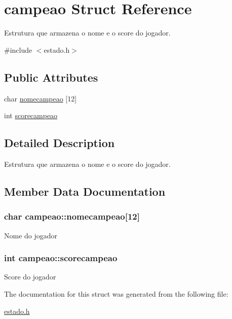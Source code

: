 \hypertarget{structcampeao}{}\section{campeao Struct Reference}
\label{structcampeao}


Estrutura que armazena o nome e o score do jogador.  




{\ttfamily \#include $<$estado.\+h$>$}

\subsection*{Public Attributes}
\begin{DoxyCompactItemize}
\item 
char \hyperlink{structcampeao_a5e650a9528817e038f8da6091f939e3e}{nomecampeao} \mbox{[}12\mbox{]}
\item 
int \hyperlink{structcampeao_a54324b4792bc6843c94fe45ed9ad5f35}{scorecampeao}
\end{DoxyCompactItemize}


\subsection{Detailed Description}
Estrutura que armazena o nome e o score do jogador. 

\subsection{Member Data Documentation}
\subsubsection[{\texorpdfstring{nomecampeao}{nomecampeao}}]{\setlength{\rightskip}{0pt plus 5cm}char campeao\+::nomecampeao\mbox{[}12\mbox{]}}\hypertarget{structcampeao_a5e650a9528817e038f8da6091f939e3e}{}\label{structcampeao_a5e650a9528817e038f8da6091f939e3e}
Nome do jogador 
\subsubsection[{\texorpdfstring{scorecampeao}{scorecampeao}}]{\setlength{\rightskip}{0pt plus 5cm}int campeao\+::scorecampeao}\hypertarget{structcampeao_a54324b4792bc6843c94fe45ed9ad5f35}{}\label{structcampeao_a54324b4792bc6843c94fe45ed9ad5f35}
Score do jogador 

The documentation for this struct was generated from the following file\+:\begin{DoxyCompactItemize}
\item 
\hyperlink{estado_8h}{estado.\+h}\end{DoxyCompactItemize}
